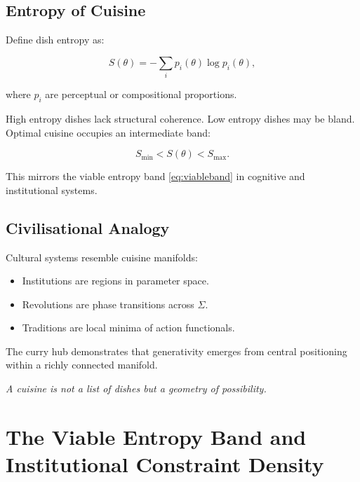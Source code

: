 \documentclass[12pt,a4paper]{article}
\theoremstyle{definition}
\begin{document}
\subsection{Entropy of Cuisine}

Define dish entropy as:

\begin{equation}
  S(\theta) = - \sum_i p_i(\theta)\log p_i(\theta),
\end{equation}

where $p_i$ are perceptual or compositional proportions.

High entropy dishes lack structural coherence.
Low entropy dishes may be bland.
Optimal cuisine occupies an intermediate band:

\begin{equation}
  S_{\min} < S(\theta) < S_{\max}.
\end{equation}

This mirrors the viable entropy band \eqref{eq:viableband}
in cognitive and institutional systems.

\subsection{Civilisational Analogy}

Cultural systems resemble cuisine manifolds:

\begin{itemize}
  \item Institutions are regions in parameter space.
  \item Revolutions are phase transitions across $\Sigma$.
  \item Traditions are local minima of action functionals.
\end{itemize}

The curry hub demonstrates that generativity emerges from
central positioning within a richly connected manifold.

\medskip
\begin{center}
  \itshape
  A cuisine is not a list of dishes but a geometry of possibility.
\end{center}

\section{The Viable Entropy Band and Institutional Constraint Density}
\label{sec:viable_entropy}
\end{document}
